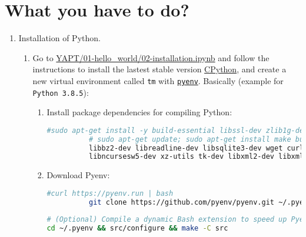 \section{What you have to do?}

\begin{enumerate}
  
\item Installation of Python.
  
  \begin{enumerate}
    
  \item Go to
    \href{https://github.com/vicente-gonzalez-ruiz/YAPT/blob/master/01-hello_world/02-installation.ipynb}{YAPT/01-hello\_world/02-installation.ipynb}
    \cite{YAPT} and follow the instructions to install the lastest
    stable version
    \href{https://en.wikipedia.org/wiki/CPython}{CPython}, and create
    a new virtual environment called \texttt{tm} with
    \href{https://github.com/pyenv/pyenv}{\texttt{pyenv}}. Basically
    (example for \verb|Python 3.8.5|):

    \begin{enumerate}
      \item Install package dependencies for compiling Python:

        \begin{lstlisting}[mathescape=false, language=Bash]
          #sudo apt-get install -y build-essential libssl-dev zlib1g-dev libbz2-dev libreadline-dev libsqlite3-dev wget curl llvm libncurses5-dev libncursesw5-dev xz-utils tk-dev libffi-dev liblzma-dev git
          # sudo apt-get update; sudo apt-get install make build-essential libssl-dev zlib1g-dev \
          libbz2-dev libreadline-dev libsqlite3-dev wget curl llvm \
          libncursesw5-dev xz-utils tk-dev libxml2-dev libxmlsec1-dev libffi-dev liblzma-dev
        \end{lstlisting}

        \item Download Pyenv:
        \begin{lstlisting}[mathescape=false, language=Bash]
          #curl https://pyenv.run | bash
          git clone https://github.com/pyenv/pyenv.git ~/.pyenv
        \end{lstlisting}

        \begin{lstlisting}[mathescape=false, language=Bash]
# (Optional) Compile a dynamic Bash extension to speed up Pyenv
cd ~/.pyenv && src/configure && make -C src


\end{lstlisting}
\end{enumerate}
\end{enumerate}
\end{enumerate}
